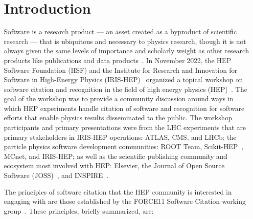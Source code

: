 \section{Introduction}\label{sec:introduction}
Software is a research product --- an asset created as a byproduct of scientific research --- that is ubiquitous and necessary to physics research, though it is not always given the same levels of importance and scholarly weight as other research products like publications and data products~\cite{Cranmer:2021urp}.
In November 2022, the HEP Software Foundation (HSF) and the Institute for Research and Innovation for Software in High-Energy Physics (IRIS-HEP)~\cite{S2I2HEPSP,IRISHEPWEB} organized a topical workshop on software citation and recognition in the field of high energy physics (HEP)~\cite{software_citation_workshop_report,software_citation_indico}.
The goal of the workshop was to provide a community discussion around ways in which HEP experiments handle citation of software and recognition for software efforts that enable physics results disseminated to the public.
The workshop participants and primary presentations were from the LHC experiments that are primary stakeholders in IRIS-HEP operations: ATLAS, CMS, and LHCb; the particle physics software development communities: ROOT Team, Scikit-HEP~\cite{Rodrigues:2020syo}, MCnet, and IRIS-HEP; as well as the scientific publishing community and ecosystem most involved with HEP: Elsevier, the Journal of Open Source Software (JOSS)~\cite{smith_journal_2018}, and INSPIRE~\cite{INSPIRE}.

The principles of software citation that the HEP community is interested in engaging with are those established by the FORCE11 Software Citation working group~\cite{smith_software_2016}.
These principles, briefly summarized, are:

